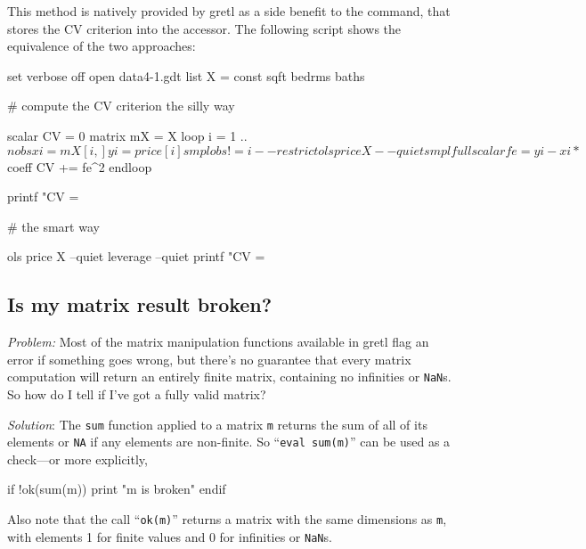 This method is natively provided by gretl as a side benefit to the
 command, that stores the CV criterion into the
 accessor. The following script shows the equivalence of
the two approaches:
\begin{code}
set verbose off
open data4-1.gdt
list X = const sqft bedrms baths

# compute the CV criterion the silly way

scalar CV = 0
matrix mX = {X}
loop i = 1 .. $nobs
    xi = mX[i,]
    yi = price[i]
    smpl obs != i --restrict
    ols price X --quiet
    smpl full
    scalar fe = yi - xi * $coeff
    CV += fe^2
endloop

printf "CV = %

# the smart way

ols price X --quiet
leverage --quiet
printf "CV = %
\end{code}

\subsection{Is my matrix result broken?}
\label{sec:brokenmat}

\emph{Problem:} Most of the matrix manipulation functions available
in gretl flag an error if something goes wrong, but there's no
guarantee that every matrix computation will return an entirely finite
matrix, containing no infinities or \texttt{NaN}s. So how do I tell if
I've got a fully valid matrix?

\emph{Solution}: The \texttt{sum} function applied to a matrix
\texttt{m} returns the sum of all of its elements or \texttt{NA} if
any elements are non-finite. So ``\texttt{eval sum(m)}'' can be used
as a check---or more explicitly,
\begin{code}
if !ok(sum(m))
    print "m is broken"
endif
\end{code}
Also note that the call ``\texttt{ok(m)}'' returns a matrix with the
same dimensions as \texttt{m}, with elements 1 for finite values and 0
for infinities or \texttt{NaN}s.

